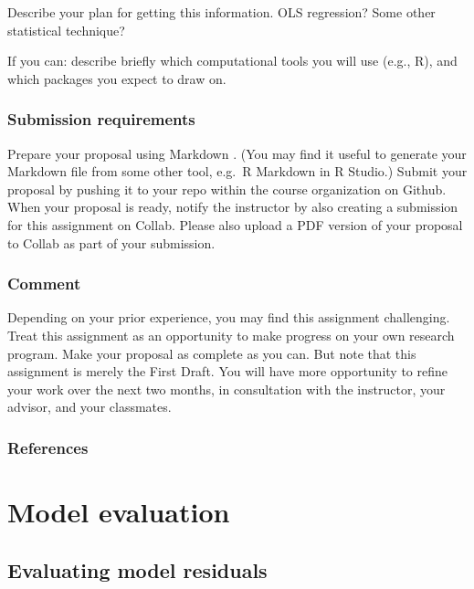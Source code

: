 \documentclass[
]{book}
\begin{document}
Describe your plan for getting this information. OLS regression? Some other statistical technique?

If you can: describe briefly which computational tools you will use (e.g., R), and which packages you expect to draw on.

\hypertarget{submission-requirements}{%
\section{Submission requirements}\label{submission-requirements}}

Prepare your proposal using Markdown . (You may find it useful to generate your Markdown file from some other tool, e.g.~R Markdown in R Studio.) Submit your proposal by pushing it to your repo within the course organization on Github. When your proposal is ready, notify the instructor by also creating a submission for this assignment on Collab. Please also upload a PDF version of your proposal to Collab as part of your submission.

\hypertarget{comment}{%
\section{Comment}\label{comment}}

Depending on your prior experience, you may find this assignment challenging. Treat this assignment as an opportunity to make progress on your own research program. Make your proposal as complete as you can. But note that this assignment is merely the First Draft. You will have more opportunity to refine your work over the next two months, in consultation with the instructor, your advisor, and your classmates.

\hypertarget{references}{%
\section{References}\label{references}}

\hypertarget{part-model-evaluation}{%
\part{Model evaluation}\label{part-model-evaluation}}

\hypertarget{evaluating-model-residuals}{%
\chapter{Evaluating model residuals}\label{evaluating-model-residuals}}
\end{document}
